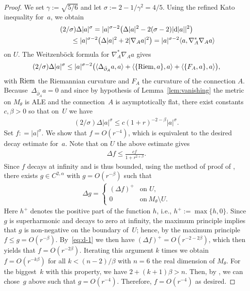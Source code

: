 \documentclass[10pt,a4paper]{amsart}
\numberwithin{equation}{section}
\newcommand{\rd}{{\rm d}}
\newcommand{\delbar}{\bar \del}
\newcommand{\del}{\partial}
\begin{document}
\begin{proof}
  We set $\gamma := \sqrt{5/6}$ and let $\sigma
  :=2-1/\gamma^2=4/5$. Using the ref\/ined Kato inequality for~$a$, we
  obtain
  \begin{gather*}
    (2/\sigma) \Delta |a|^\sigma
      = |a|^{\sigma-2}\big(\Delta|a|^2-2(\sigma-2)|\rd|a||^2\big) \\
\hphantom{(2/\sigma) \Delta |a|^\sigma}{} \leq |a|^{\sigma-2}\big(\Delta|a|^2+2|\nabla_A a|^2\big)
     = |a|^{\sigma-2}\langle a,\nabla_A^*\nabla_Aa\rangle
   \end{gather*}
   on $U$. The Weitzenb\"ock formula for $\nabla_A^*\nabla_Aa$ gives
   \begin{gather*}
    (2/\sigma) \Delta |a|^\sigma
      \leq |a|^{\sigma-2}
     \big(\langle \Delta_{\delbar_A} a,a\rangle
       +\langle \{{\rm Riem},a\},a\rangle +\langle \{F_A,a\},a\rangle \big),
   \end{gather*}
   with ${\rm Riem}$ the Riemannian curvature and $F_A$ the
   curvature of the connection $A$.  Because~$\Delta_{\delbar_A} a=0$
   and since by hypothesis of Lemma~\ref{lem:vanishing} the metric on
   $M_{\theta}$ is ALE and the connection~$A$ is asymptotically f\/lat,
   there exist constants $c,\beta>0$ so that on~$U$ we have
   \begin{gather*}
     (2/\sigma) \Delta |a|^\sigma \leq c (1+r)^{-2-\beta} |a|^{\sigma}.
   \end{gather*}
   Set $f: =|a|^\sigma$.  We show that $f=O(r^{-4})$, which is
   equivalent to the desired decay estimate for~$a$.  Note that on
   $U$ the above estimate gives
   \begin{gather}\label{eq:d-1}
     \Delta f \leq \frac{cf}{1+r^{2+\beta}}.
   \end{gather}
   Since $f$ decays at inf\/inity and is thus bounded, using the method of proof of
   \cite[Theorem~8.3.6(a)]{Joyce2000}, there exists $g\in
   C^{2,\alpha}$ with $g=O(r^{-\beta})$ such that
    \begin{gather*}
     \Delta g
     =\begin{cases}
       (\Delta f)^+ & \text{on $U$}, \\
       0 & \text{on}~M_{\theta}{\setminus} U .
     \end{cases}
  \end{gather*}
  Here $h^+$ denotes the positive part of the function $h$, i.e., $h^+
  := \max \{h, 0\}$.  Since $g$ is superharmonic and decays to zero at
  inf\/inity, the maximum principle implies that $g$ is non-negative on
  the boundary of~$U$; hence, by the maximum principle $f\leq g =
  O(r^{-\beta})$.  By~\eqref{eq:d-1} we then have $(\Delta f)^{+}=
  O(r^{-2-2\beta})$, which then yields that $f=O(r^{-2\beta})$.
  Iterating this argument $k$ times we obtain $f=O(r^{-k\beta})$ for
  all $k< (n-2)/\beta$ with $n = 6$ the real dimension of $M_\theta$.
  For the biggest~$k$ with this property, we have $2+(k+1)\beta>n$.
  Then, by \cite[Theorem~8.3.6(b)]{Joyce2000}, we can chose~$g$ above
  such that $g=O(r^{-4})$.  Therefore, $f=O(r^{-4})$ as desired.
\end{proof}
\end{document}
